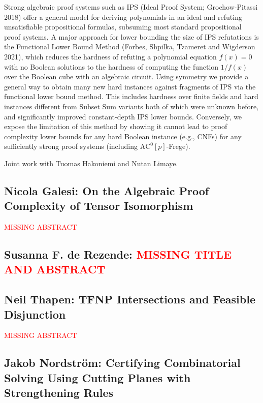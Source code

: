 \documentclass[11pt]{article}
\begin{document}
Strong algebraic proof systems such as IPS (Ideal Proof System; Grochow-Pitassi 2018)
offer a general model for deriving polynomials in an ideal and refuting unsatisfiable propositional
formulas, subsuming most standard propositional proof systems. A major approach for lower
bounding the size of IPS refutations is the Functional Lower Bound Method (Forbes, Shpilka,
Tzameret and Wigderson 2021), which reduces the hardness of refuting a polynomial
equation $f(x) = 0$ with no Boolean solutions to the hardness of computing the function $1/f(x)$
over the Boolean cube with an algebraic circuit. Using symmetry we provide a general way to
obtain many new hard instances against fragments of IPS via the functional lower bound method.
This includes hardness over finite fields and hard instances different from Subset Sum variants
both of which were unknown before, and significantly improved constant-depth IPS lower bounds. 
Conversely, we expose the limitation of this method by showing it cannot lead to proof complexity 
lower bounds for any hard Boolean instance (e.g., CNFs) for any sufficiently strong proof systems 
(including $\mathrm{AC}^0[p]$-Frege).

Joint work with Tuomas Hakoniemi and Nutan Limaye.





\subsection*{Nicola Galesi: On the Algebraic Proof Complexity of Tensor Isomorphism}\label{Galesi}
\textcolor{red}{MISSING ABSTRACT}



\subsection*{Susanna F. de Rezende: \textcolor{red}{MISSING TITLE AND ABSTRACT}}\label{Rezende}


\subsection*{Neil Thapen: TFNP Intersections and Feasible Disjunction}\label{Thapen}
\textcolor{red}{MISSING ABSTRACT}

\subsection*{Jakob Nordstr\"{o}m: Certifying Combinatorial Solving Using Cutting Planes with Strengthening Rules}\label{Nordstrom}
\end{document}

